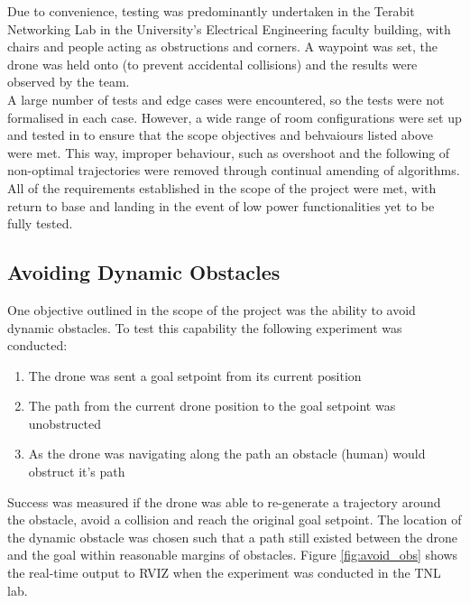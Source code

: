 \documentclass[capstone_report.tex]{subfiles}
\begin{document}
Due to convenience, testing was predominantly undertaken in the Terabit Networking Lab in the University’s Electrical Engineering faculty building, with chairs and people acting as obstructions and corners. A waypoint was set, the drone was held onto (to prevent accidental collisions) and the results were observed by the team.\\

A large number of tests and edge cases were encountered, so the tests were not formalised in each case. However, a wide range of room configurations were set up and tested in to ensure that the scope objectives and behvaiours listed above were met. This way, improper behaviour, such as overshoot and the following of non-optimal trajectories were removed through continual amending of algorithms. All of the requirements established in the scope of the project were met, with return to base and landing in the event of low power functionalities yet to be fully tested.

\subsection{Avoiding Dynamic Obstacles}
One objective outlined in the scope of the project was the ability to avoid dynamic obstacles.  To test this capability the following experiment was conducted:
\begin{enumerate}
    \item The drone was sent a goal setpoint from its current position
    \item The path from the current drone position to the goal setpoint was unobstructed
    \item As the drone was navigating along the path an obstacle (human) would obstruct it's path
\end{enumerate}
Success was measured if the drone was able to re-generate a trajectory around the obstacle, avoid a collision and reach the original goal setpoint.  The location of the dynamic obstacle was chosen such that a path still existed between the drone and the goal within reasonable margins of obstacles.  Figure \ref{fig:avoid_obs} shows the real-time output to RVIZ when the experiment was conducted in the TNL lab.
\end{document}

